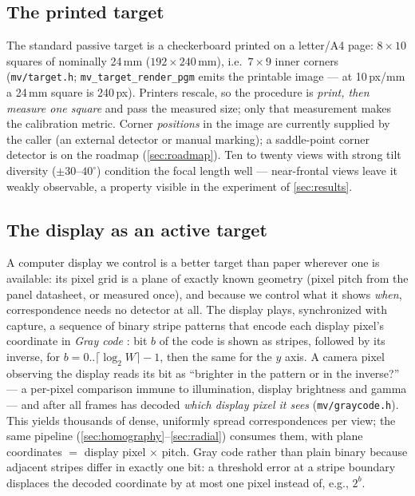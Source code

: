\documentclass[11pt]{article}
\theoremstyle{definition}
\newcommand{\code}[1]{\texttt{#1}}
\begin{document}
\subsection{The printed target}
\label{sec:printed}

The standard passive target is a checkerboard printed on a letter/A4 page:
$8\times10$ squares of nominally 24\,mm ($192\times240$\,mm), i.e.\
$7\times9$ inner corners (\code{mv/target.h};
\code{mv\_target\_render\_pgm} emits the printable image --- at 10\,px/mm a
24\,mm square is 240\,px). Printers rescale, so the procedure is
\emph{print, then measure one square} and pass the measured size; only that
measurement makes the calibration metric. Corner \emph{positions} in the
image are currently supplied by the caller (an external detector or manual
marking); a saddle-point corner detector is on the roadmap
(\autoref{sec:roadmap}). Ten to twenty views with strong tilt diversity
($\pm30$--$40^\circ$) condition the focal length well --- near-frontal views
leave it weakly observable, a property visible in the experiment of
\autoref{sec:results}.

\subsection{The display as an active target}
\label{sec:display}

A computer display we control is a better target than paper wherever one is
available: its pixel grid is a plane of exactly known geometry (pixel pitch
from the panel datasheet, or measured once), and because we control what it
shows \emph{when}, correspondence needs no detector at all. The display
plays, synchronized with capture, a sequence of binary stripe patterns that
encode each display pixel's coordinate in \emph{Gray code}
\cite{Inokuchi1984,Geng2011}: bit $b$ of the code is shown as stripes,
followed by its inverse, for $b=0..\lceil\log_2 W\rceil{-}1$, then the same
for the $y$ axis. A camera pixel observing the display reads its bit as
``brighter in the pattern or in the inverse?'' --- a per-pixel comparison
immune to illumination, display brightness and gamma --- and after all
frames has decoded \emph{which display pixel it sees}
(\code{mv/graycode.h}). This yields thousands of dense, uniformly spread
correspondences per view; the same pipeline
(\autoref{sec:homography}--\autoref{sec:radial}) consumes them, with plane
coordinates $=$ display pixel $\times$ pitch. Gray code rather than plain
binary because adjacent stripes differ in exactly one bit: a threshold error
at a stripe boundary displaces the decoded coordinate by at most one pixel
instead of, e.g., $2^{b}$.
\end{document}
